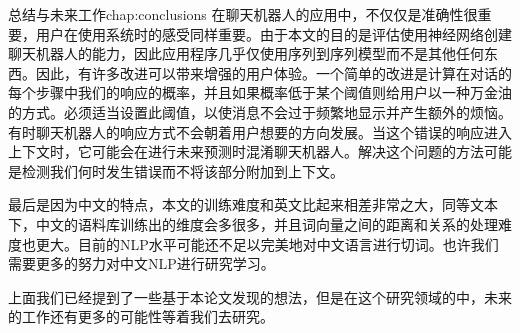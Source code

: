 \begin{cuzchapter}{总结与未来工作}{chap:conclusions}
在聊天机器人的应用中，不仅仅是准确性很重要，用户在使用系统时的感受同样重要。由于本文的目的是评估使用神经网络创建聊天机器人的能力，因此应用程序几乎仅使用序列到序列模型而不是其他任何东西。因此，有许多改进可以带来增强的用户体验。一个简单的改进是计算在对话的每个步骤中我们的响应的概率，并且如果概率低于某个阈值则给用户以一种万金油的方式。必须适当设置此阈值，以使消息不会过于频繁地显示并产生额外的烦恼。有时聊天机器人的响应方式不会朝着用户想要的方向发展。当这个错误的响应进入上下文时，它可能会在进行未来预测时混淆聊天机器人。解决这个问题的方法可能是检测我们何时发生错误而不将该部分附加到上下文。

最后是因为中文的特点，本文的训练难度和英文比起来相差非常之大，同等文本下，中文的语料库训练出的维度会多很多，并且词向量之间的距离和关系的处理难度也更大。目前的NLP水平可能还不足以完美地对中文语言进行切词。也许我们需要更多的努力对中文NLP进行研究学习。

上面我们已经提到了一些基于本论文发现的想法，但是在这个研究领域的中，未来的工作还有更多的可能性等着我们去研究。
\end{cuzchapter}